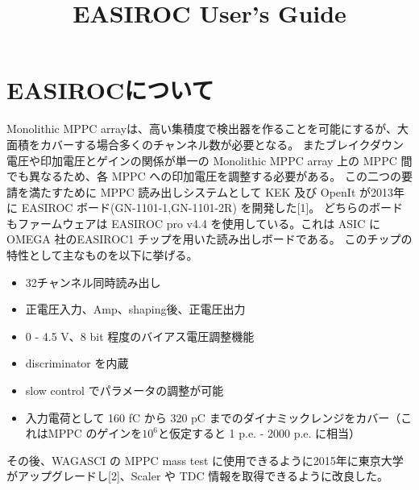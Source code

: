 \documentclass[a4paper]{report}
\begin{document}
\title{EASIROC User's Guide}

\maketitle


\newpage
\section{EASIROCについて}
Monolithic MPPC arrayは、高い集積度で検出器を作ることを可能にするが、大面積をカバーする場合多くのチャンネル数が必要となる。
またブレイクダウン電圧や印加電圧とゲインの関係が単一の Monolithic MPPC array 上の MPPC 間でも異なるため、各 MPPC への印加電圧を調整する必要がある。
この二つの要請を満たすために MPPC 読み出しシステムとして KEK 及び OpenIt が2013年に EASIROC ボード(GN-1101-1,GN-1101-2R) を開発した[1]。
どちらのボードもファームウェアは EASIROC pro v4.4 を使用している。これは ASIC に OMEGA 社のEASIROC1 チップを用いた読み出しボードである。
このチップの特性として主なものを以下に挙げる。
\begin{itemize}
\item 32チャンネル同時読み出し
\item 正電圧入力、Amp、shaping後、正電圧出力
\item 0 - 4.5 V、8 bit 程度のバイアス電圧調整機能
\item discriminator を内蔵
\item slow control でパラメータの調整が可能
\item 入力電荷として 160 fC から 320 pC までのダイナミックレンジをカバー（これはMPPC のゲインを$10^6$と仮定すると 1 p.e. - 2000 p.e. に相当）
\end{itemize}

その後、WAGASCI の MPPC mass test に使用できるように2015年に東京大学がアップグレードし[2]、Scaler や TDC 情報を取得できるように改良した。

\newpage
\end{document}
